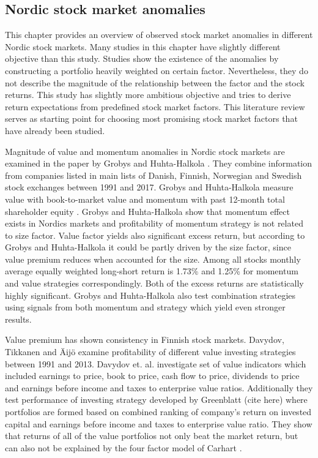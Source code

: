 \documentclass{article}
\begin{document}

\subsection{Nordic stock market anomalies}\label{NordicStockMarketAnomalies}
This chapter provides an overview of observed stock market anomalies in different Nordic stock markets. Many studies in this chapter have slightly different objective than this study. Studies show the existence of the anomalies by constructing a portfolio heavily weighted on certain factor. Nevertheless, they do not describe the magnitude of the relationship between the factor and the stock returns. This study has slightly more ambitious objective and tries to derive return expectations from predefined stock market factors. This literature review serves as starting point for choosing most promising stock market factors that have already been studied.

Magnitude of value and momentum anomalies in Nordic stock markets are examined in the paper by Grobys and Huhta-Halkola \citeyear{grobys}. They combine information from companies listed in main lists of Danish, Finnish, Norwegian and Swedish stock exchanges between 1991 and 2017. Grobys and Huhta-Halkola measure value with book-to-market value and momentum with past 12-month total shareholder equity%
. Grobys and Huhta-Halkola show that momentum effect exists in Nordics markets and profitability of momentum strategy is not related to size factor. Value factor yields also significant excess return, but according to Grobys and Huhta-Halkola it could be partly driven by the size factor, since value premium reduces when accounted for the size. Among all stocks monthly average equally weighted long-short return is 1.73\% and 1.25\% for momentum and value strategies correspondingly. Both of the excess returns are statistically highly significant. Grobys and Huhta-Halkola also test combination strategies using signals from both momentum and strategy which yield even stronger results.

Value premium has shown consistency in Finnish stock markets. Davydov, Tikkanen and Äijö \citeyear{Davydov2017MagicFV} examine profitability of different value investing strategies between 1991 and 2013. Davydov et. al. investigate set of value indicators which included earnings to price, book to price, cash flow to price, dividends to price and earnings before income and taxes to enterprise value ratios. Additionally they test performance of investing strategy developed by Greenblatt (cite here) where portfolios are formed based on combined ranking of company's return on invested capital and earnings before income and taxes to enterprise value ratio. They show that returns of all of the value portfolios not only beat the market return, but can also not be explained by the four factor model of Carhart \citeyear{https://doi.org/10.1111/j.1540-6261.1997.tb03808.x}.  
\end{document}

